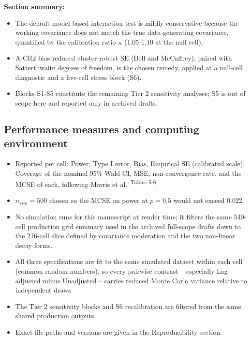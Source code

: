 \documentclass[
  11pt,
]{article}
\providecommand{\tightlist}{%
  \setlength{\itemsep}{0pt}\setlength{\parskip}{0pt}}
\begin{document}
\textbf{Section summary:}

\begin{itemize}
\tightlist
\item
  The default model-based interaction test is mildly conservative
  because the working covariance does not match the true
  data-generating covariance, quantified by the calibration ratio
  \(\kappa\) (1.05-1.10 at the null cell).
\item
  A CR2 bias-reduced cluster-robust SE (Bell and McCaffrey), paired
  with Satterthwaite degrees of freedom, is the chosen remedy,
  applied at a null-cell diagnostic and a five-cell stress block
  (S6).
\item
  Blocks S1-S5 constitute the remaining Tier 2 sensitivity analyses;
  S5 is out of scope here and reported only in archived drafts.
\end{itemize}

\subsection{Performance measures and computing environment}\label{performance-measures-and-computing-environment}

\begin{itemize}
\tightlist
\item
  Reported per cell: Power, Type I error, Bias, Empirical SE
  (calibrated scale), Coverage of the nominal 95\% Wald CI, MSE,
  non-convergence rate, and the MCSE of each, following Morris et al.\textsuperscript{, Tables 5-6}.
\item
  \(n_{sim} = 500\) chosen so the MCSE on power at \(p = 0.5\) would not
  exceed 0.022.
\item
  No simulation runs for this manuscript at render time; it filters
  the same 540-cell production grid summary used in the archived
  full-scope drafts down to the 216-cell slice defined by covariance
  moderation and the two non-linear decay forms.
\item
  All three specifications are fit to the same simulated dataset
  within each cell (common random numbers), so every pairwise
  contrast -- especially Lag-adjusted minus Unadjusted -- carries
  reduced Monte Carlo variance relative to independent draws.
\item
  The Tier 2 sensitivity blocks and S6 recalibration are filtered
  from the same shared production outputs.
\item
  Exact file paths and versions are given in the Reproducibility
  section.
\end{itemize}
\end{document}
